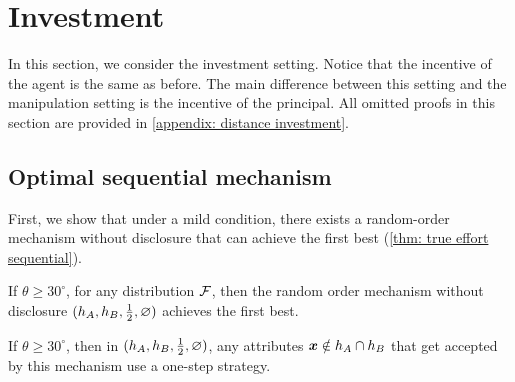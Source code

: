 \section{Investment}\label{subsec: distance investment}
In this section, we consider the investment setting. Notice that the incentive of the agent is the same as before. The main difference between this setting and the manipulation setting is the incentive of the principal. All omitted proofs in this section are provided in \cref{appendix: distance investment}.

\subsection{Optimal sequential mechanism}
First, we  show that under a mild condition, there exists a random-order mechanism without disclosure that can achieve the first best (\cref{thm: true effort sequential}).



\begin{theorem}\label{thm: true effort sequential}
    If $\theta\geq 30^{\circ}$, for any distribution $\mathcal{F}$, 
   then the   random order mechanism without disclosure $(h_A,h_B,\frac12,\varnothing)$ achieves the first best.
\end{theorem}

\begin{lemma}\label{claim same behavior}
    If $\theta\geq 30^{\circ}$, then in $(h_A,h_B,\frac12,\varnothing)$, any attributes $\boldsymbol{x}\notin h_A\cap h_B$ that get accepted by this mechanism use a one-step strategy.
\end{lemma}



